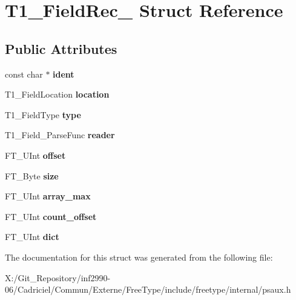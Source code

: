 \hypertarget{struct_t1___field_rec__}{\section{T1\-\_\-\-Field\-Rec\-\_\- Struct Reference}
\label{struct_t1___field_rec__}
}
\subsection*{Public Attributes}
\begin{DoxyCompactItemize}
\item 
\hypertarget{struct_t1___field_rec___aaf70ae870eff9ea2b0518ef5e7301cfd}{const char $\ast$ {\bfseries ident}}\label{struct_t1___field_rec___aaf70ae870eff9ea2b0518ef5e7301cfd}

\item 
\hypertarget{struct_t1___field_rec___a1e17111c68df523f82d20bddd822ca4d}{T1\-\_\-\-Field\-Location {\bfseries location}}\label{struct_t1___field_rec___a1e17111c68df523f82d20bddd822ca4d}

\item 
\hypertarget{struct_t1___field_rec___ad873155b36b72db9a1feaf2699fed1ce}{T1\-\_\-\-Field\-Type {\bfseries type}}\label{struct_t1___field_rec___ad873155b36b72db9a1feaf2699fed1ce}

\item 
\hypertarget{struct_t1___field_rec___a95e227de47c22bdadd77f797ff43d89d}{T1\-\_\-\-Field\-\_\-\-Parse\-Func {\bfseries reader}}\label{struct_t1___field_rec___a95e227de47c22bdadd77f797ff43d89d}

\item 
\hypertarget{struct_t1___field_rec___a41b503016f68291e061a2e29498982c1}{F\-T\-\_\-\-U\-Int {\bfseries offset}}\label{struct_t1___field_rec___a41b503016f68291e061a2e29498982c1}

\item 
\hypertarget{struct_t1___field_rec___a8ce74a7ad2276abe8942883e7fbb1241}{F\-T\-\_\-\-Byte {\bfseries size}}\label{struct_t1___field_rec___a8ce74a7ad2276abe8942883e7fbb1241}

\item 
\hypertarget{struct_t1___field_rec___a87f063bd3ad0dcfa30c00946d9f9cae8}{F\-T\-\_\-\-U\-Int {\bfseries array\-\_\-max}}\label{struct_t1___field_rec___a87f063bd3ad0dcfa30c00946d9f9cae8}

\item 
\hypertarget{struct_t1___field_rec___a41d8814cc651d0276f8cfad751721326}{F\-T\-\_\-\-U\-Int {\bfseries count\-\_\-offset}}\label{struct_t1___field_rec___a41d8814cc651d0276f8cfad751721326}

\item 
\hypertarget{struct_t1___field_rec___a509f7ddb1e0ffe050017daa29223e224}{F\-T\-\_\-\-U\-Int {\bfseries dict}}\label{struct_t1___field_rec___a509f7ddb1e0ffe050017daa29223e224}

\end{DoxyCompactItemize}


The documentation for this struct was generated from the following file\-:\begin{DoxyCompactItemize}
\item 
X\-:/\-Git\-\_\-\-Repository/inf2990-\/06/\-Cadriciel/\-Commun/\-Externe/\-Free\-Type/include/freetype/internal/psaux.\-h\end{DoxyCompactItemize}

